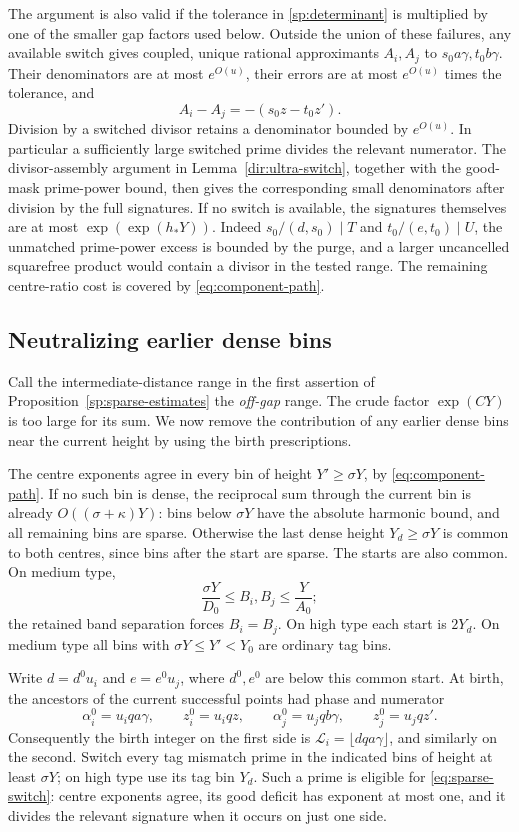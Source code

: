The argument is also valid if the tolerance in
\eqref{sp:determinant} is multiplied by one of the smaller gap factors
used below.  Outside the union of these failures, any available switch
gives coupled, unique rational approximants $A_i,A_j$ to
$s_0a\gamma,t_0b\gamma$.  Their denominators are at most $e^{O(u)}$,
their errors are at most $e^{O(u)}$ times the tolerance, and
\[
 A_i-A_j=-(s_0z-t_0z').
\]
Division by a switched divisor retains a denominator bounded by
$e^{O(u)}$.  In particular a sufficiently large switched prime divides
the relevant numerator.  The divisor-assembly argument in
Lemma~\ref{dir:ultra-switch}, together with the good-mask prime-power
bound, then gives the corresponding small denominators after division
by the full signatures.  If no switch is available, the signatures
themselves are at most $\exp(\exp(h_*Y))$.  Indeed
$s_0/(d,s_0)\mid T$ and $t_0/(e,t_0)\mid U$, the unmatched prime-power
excess is bounded by the purge, and a larger uncancelled squarefree
product would contain a divisor in the tested range.  The remaining
centre-ratio cost is covered by \eqref{eq:component-path}.

\subsection{Neutralizing earlier dense bins}

Call the intermediate-distance range in the first assertion of
Proposition~\ref{sp:sparse-estimates} the \emph{off-gap} range.
The crude factor $\exp(CY)$ is too large for its sum.  We now
remove the contribution of any earlier dense bins near the current
height by using the birth prescriptions.

The centre exponents agree in every bin of height $Y'\ge\sigma Y$,
by \eqref{eq:component-path}.  If no such bin is dense, the reciprocal
sum through the current bin is already $O((\sigma+\kappa)Y)$: bins
below $\sigma Y$ have the absolute harmonic bound, and all remaining
bins are sparse.  Otherwise the last dense height $Y_d\ge\sigma Y$
is common to both centres, since bins after the start are sparse.
The starts are also common.  On medium type,
\[
 \frac{\sigma Y}{D_0}\le B_i,B_j\le\frac{Y}{A_0};
\]
the retained band separation forces $B_i=B_j$.  On high type each start
is $2Y_d$.  On medium type all bins with
$\sigma Y\le Y'<Y_0$ are ordinary tag bins.

Write $d=d^0u_i$ and $e=e^0u_j$, where $d^0,e^0$ are below this common
start.  At birth, the ancestors of the current successful points had
phase and numerator
\[
 \alpha_i^0=u_iqa\gamma,\qquad z_i^0=u_iqz,
 \qquad
 \alpha_j^0=u_jqb\gamma,\qquad z_j^0=u_jqz'.
\]
Consequently the birth integer on the first side is
$\mathcal L_i=\lfloor dqa\gamma\rfloor$, and similarly on the second.
Switch every tag mismatch prime in the indicated bins of height at
least $\sigma Y$; on high type use its tag bin $Y_d$.  Such a prime is
eligible for \eqref{eq:sparse-switch}: centre exponents agree, its good
deficit has exponent at most one, and it divides the relevant signature
when it occurs on just one side.


